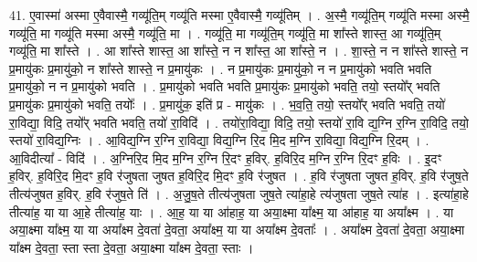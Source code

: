\documentclass[17pt]{extarticle}
\begin{document}
41. ए॒वास्मा॑ अस्मा ए॒वैवास्मै॒ गव्यू॑ति॒म् गव्यू॑ति मस्मा ए॒वैवास्मै॒ गव्यू॑तिम् । . अ॒स्मै॒ गव्यू॑ति॒म् गव्यू॑ति मस्मा अस्मै॒ गव्यू॑ति॒ मा गव्यू॑ति मस्मा अस्मै॒ गव्यू॑ति॒ मा । . गव्यू॑ति॒ मा गव्यू॑ति॒म् गव्यू॑ति॒ मा शा᳚स्ते शास्त॒ आ गव्यू॑ति॒म् गव्यू॑ति॒ मा शा᳚स्ते । . आ शा᳚स्ते शास्त॒ आ शा᳚स्ते॒ न न शा᳚स्त॒ आ शा᳚स्ते॒ न । . शा॒स्ते॒ न न शा᳚स्ते शास्ते॒ न प्र॒मायु॑कः प्र॒मायु॑को॒ न शा᳚स्ते शास्ते॒ न प्र॒मायु॑कः । . न प्र॒मायु॑कः प्र॒मायु॑को॒ न न प्र॒मायु॑को भवति भवति प्र॒मायु॑को॒ न न प्र॒मायु॑को भवति । . प्र॒मायु॑को भवति भवति प्र॒मायु॑कः प्र॒मायु॑को भवति॒ तयो॒ स्तयो᳚र् भवति प्र॒मायु॑कः प्र॒मायु॑को भवति॒ तयोः᳚ । . प्र॒मायु॑क॒ इति॑ प्र - मायु॑कः । . भ॒व॒ति॒ तयो॒ स्तयो᳚र् भवति भवति॒ तयो॑ रा॒विद्या॒ विदि॒ तयो᳚र् भवति भवति॒ तयो॑ रा॒विदि॑ । . तयो॑रा॒विद्या॒ विदि॒ तयो॒ स्तयो॑ रा॒वि द्य॒ग्नि र॒ग्नि रा॒विदि॒ तयो॒ स्तयो॑ रा॒विद्य॒ग्निः । . आ॒विद्य॒ग्नि र॒ग्नि रा॒विद्या॒ विद्य॒ग्नि रि॒द मि॒द म॒ग्नि रा॒विद्या॒ विद्य॒ग्नि रि॒दम् । . आ॒विदीत्या᳚ - विदि॑ । . अ॒ग्निरि॒द मि॒द म॒ग्नि र॒ग्नि रि॒दꣳ ह॒विर्. ह॒विरि॒द म॒ग्नि र॒ग्नि रि॒दꣳ ह॒विः । . इ॒दꣳ ह॒विर्. ह॒विरि॒द मि॒दꣳ ह॒वि र॑जुषता जुषत ह॒विरि॒द मि॒दꣳ ह॒वि र॑जुषत । . ह॒वि र॑जुषता जुषत ह॒विर्. ह॒वि र॑जुष॒ते तीत्य॑जुषत ह॒विर्. ह॒वि र॑जुष॒ते ति॑ । . अ॒जु॒ष॒ते तीत्य॑जुषता जुष॒ते त्या॑हा॒हे त्य॑जुषता जुष॒ते त्या॑ह । . इत्या॑हा॒हे तीत्या॑ह॒ या या आ॒हे तीत्या॑ह॒ याः । . आ॒ह॒ या या आ॑हाह॒ या अया॒क्ष्मा या᳚क्ष्म॒ या आ॑हाह॒ या अया᳚क्ष्म । . या अया॒क्ष्मा या᳚क्ष्म॒ या या अया᳚क्ष्म दे॒वता॑ दे॒वता॒ अया᳚क्ष्म॒ या या अया᳚क्ष्म दे॒वताः᳚ । . अया᳚क्ष्म दे॒वता॑ दे॒वता॒ अया॒क्ष्मा या᳚क्ष्म दे॒वता॒ स्ता स्ता दे॒वता॒ अया॒क्ष्मा या᳚क्ष्म दे॒वता॒ स्ताः । \newline
\pagebreak
{}
\end{document}
